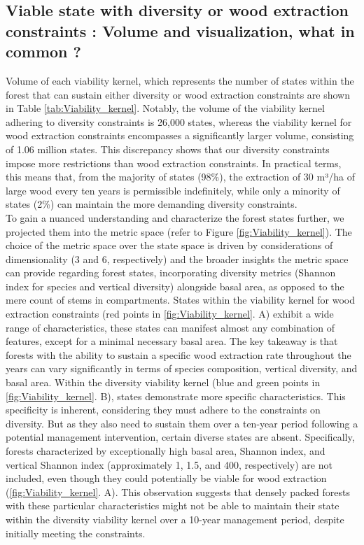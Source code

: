 \documentclass{article}
\begin{document}
\subsection{Viable state with diversity or wood extraction constraints : Volume and visualization, what in common ?}

Volume of each viability kernel, which represents the number of states within the forest that can sustain either diversity or wood extraction constraints are shown in Table \ref{tab:Viability_kernel}. Notably, the volume of the viability kernel adhering to diversity constraints is 26,000 states, whereas the viability kernel for wood extraction constraints encompasses a significantly larger volume, consisting of 1.06 million states. This discrepancy shows that our diversity constraints impose more restrictions than wood extraction constraints. In practical terms, this means that, from the majority of states (98\%), the extraction of 30 m³/ha of large wood every ten years is permissible indefinitely, while only a minority of states (2\%) can maintain the more demanding diversity constraints. \\
To gain a nuanced understanding and characterize the forest states further, we projected them into the metric space (refer to Figure \ref{fig:Viability_kernel}). The choice of the metric space over the state space is driven by considerations of dimensionality (3 and 6, respectively) and the broader insights the metric space can provide regarding forest states, incorporating diversity metrics (Shannon index for species and vertical diversity) alongside basal area, as opposed to the mere count of stems in compartments. States within the viability kernel for wood extraction constraints (red points in \ref{fig:Viability_kernel}. A) exhibit a wide range of characteristics, these states can manifest almost any combination of features, except for a minimal necessary basal area. The key takeaway is that forests with the ability to sustain a specific wood extraction rate throughout the years can vary significantly in terms of species composition, vertical diversity, and basal area. Within the diversity viability kernel (blue and green points in \ref{fig:Viability_kernel}. B), states demonstrate more specific characteristics. This specificity is inherent, considering they must adhere to the constraints on diversity. But as they also need to sustain them over a ten-year period following a potential management intervention, certain diverse states are absent. Specifically, forests characterized by exceptionally high basal area, Shannon index, and vertical Shannon index (approximately 1, 1.5, and 400, respectively) are not included, even though they could potentially be viable for wood extraction (\ref{fig:Viability_kernel}. A). This observation suggests that densely packed forests with these particular characteristics might not be able to maintain their state within the diversity viability kernel over a 10-year management period, despite initially meeting the constraints.\\
\end{document}
